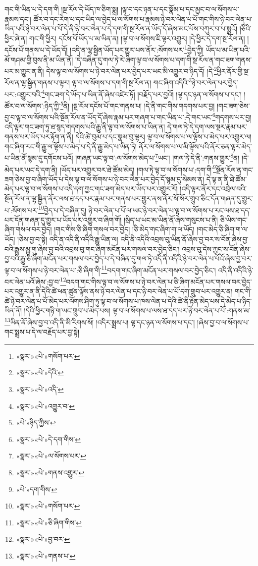 གང་གི་ཡིན་པ་དེ་དག་གི །སྔ་རོལ་དེ་ཡོད་ཁ་ཅིག་སྨྲ། །ལྟ་བ་དང་ཉན་པ་དང་སྣོམ་པ་དང་མྱང་བ་ལ་སོགས་པ་རྣམས་དང་། ཚོར་བ་དང་རེག་པ་དང་ཡིད་ལ་བྱེད་པ་ལ་སོགས་པ་རྣམས་ཉེ་བར་ལེན་པ་པོ་གང་གིས་ཉེ་བར་ལེན་པ་ཡིན་པའི་ཉེ་བར་ལེན་པ་པོ་དེ་ནི་ཉེ་བར་ལེན་པ་དེ་དག་གི་སྔ་རོལ་ན་ཡོད་དོ་ཞེས་མང་པོས་བཀུར་བ་པ་སྨྲའོ། །ཅིའི་ཕྱིར་ཞེ་ན། གང་གི་ཕྱིར། དངོས་པོ་ཡོད་པ་མ་ཡིན་ན། །ལྟ་བ་ལ་སོགས་ཇི་ལྟར་འགྱུར། །དེ་ཕྱིར་དེ་དག་སྔ་རོལ་ན། །དངོས་པོ་གནས་པ་དེ་ཡོད་དོ། །འདི་ན་ལྷ་སྦྱིན་ཡོད་པར་གྱུར་པས་ནོར་:སོགས་པར་\footnote{«སྣར་»«པེ་»གསོག་པར་}བྱེད་ཀྱི། ཡོད་པ་མ་ཡིན་པའི་མོ་གཤམ་གྱི་བུས་ནི་མ་ཡིན་ནོ། །དེ་བཞིན་དུ་གལ་ཏེ་རེ་ཞིག་ལྟ་བ་ལ་སོགས་པ་དག་གི་སྔ་རོལ་ན་གང་ཟག་གནས་པར་མ་གྱུར་ན་ནི། དེས་ལྟ་བ་ལ་སོགས་པ་ཉེ་བར་ལེན་པར་བྱེད་པར་ཡང་མི་འགྱུར་བ་ཉིད་དོ། །དེ་\footnote{«སྣར་»«པེ་»དེའི་}ཕྱིར་ནོར་གྱི་སྔ་རོལ་ན་ལྷ་སྦྱིན་གནས་པ་ལྟར། ལྟ་བ་ལ་སོགས་པ་དག་གི་སྔ་རོལ་ན། གང་ཞིག་འདིའི་\footnote{«སྣར་»«པེ་»འདི་}ཉེ་བར་ལེན་པར་བྱེད་པར་:འགྱུར་བའི་\footnote{«སྣར་»«པེ་»འགྱུར་བ་}གང་ཟག་དེ་ཡོད་པ་ཡིན་ནོ་ཞེས་འཛེར་ཏོ། །བརྗོད་པར་བྱའོ། །ལྟ་དང་ཉན་ལ་སོགས་པ་དང་། །ཚོར་བ་ལ་སོགས་:ཉིད་ཀྱི་\footnote{«པེ་»ཉིད་ཀྱིས་}ནི། །སྔ་རོལ་དངོས་པོ་གང་གནས་པ། །དེ་ནི་གང་གིས་གདགས་པར་བྱ། །གང་ཟག་ཅེས་བྱ་བ་ལྟ་བ་ལ་སོགས་པའི་སྔོན་རོལ་ན་ཡོད་དོ་ཞེས་རྣམ་པར་གཞག་པ་གང་ཡིན་པ་:དེ་གང་ཡང་\footnote{«སྣར་»«པེ་»དེ་དག་གིས་}གདགས་པར་བྱ། འདི་ལྟར་གང་ཟག་ཏུ་ཐ་སྙད་གདགས་པའི་རྒྱུ་ནི་ལྟ་བ་ལ་སོགས་པ་ཡིན་ན། དེ་གལ་ཏེ་དེ་དག་ལས་སྔར་རྣམ་པར་གནས་པར་ཡོད་པར་རྟོག་ན་ནི། དེའི་ཚེ་བུམ་པ་དང་སྣམ་བུ་ལྟར། ལྟ་བ་ལ་སོགས་པ་ལ་ལྟོས་པ་མེད་པར་འགྱུར་ལ། གང་ཞིག་རང་གི་རྒྱུ་ལ་ལྟོས་པ་མེད་པ་དེ་ནི་རྒྱུ་མེད་པ་ཡིན་ཏེ། ནོར་ལ་སོགས་པ་ལ་མི་ལྟོས་པའི་ནོར་ཅན་ལྟར་མེད་པ་ཡིན་ནོ་སྙམ་དུ་དགོངས་པའོ། །གཞན་ཡང་ལྟ་བ་:ལ་སོགས་མེད་པ་\footnote{«སྣར་»«པེ་»ལ་སོགས་པར་}ཡང་། །གལ་ཏེ་དེ་ནི་:གནས་གྱུར་\footnote{«སྣར་»«པེ་»གནས་འགྱུར་}ན། །དེ་མེད་པར་ཡང་དེ་དག་ནི། །ཡོད་པར་འགྱུར་བར་ཐེ་ཚོམ་མེད། །གལ་ཏེ་ལྟ་བ་ལ་སོགས་པ་:དག་གི་\footnote{«པེ་»དག་གིས་}སྔོན་རོལ་ན་གང་ཟག་ཅེས་བྱ་བ་ཞིག་ཡོད་པ་དེས་ལྟ་བ་ལ་སོགས་པ་ཉེ་བར་ལེན་པར་བྱེད་དོ་སྙམ་དུ་སེམས་ན། དེ་ལྟ་ན་ནི་ཐེ་ཚོམ་མེད་པར་ལྟ་བ་ལ་སོགས་པ་འདི་དག་ཀྱང་གང་ཟག་མེད་པར་ཡོད་པར་འགྱུར་རོ། །འདི་ལྟར་ནོར་དང་འབྲེལ་བའི་སྔོན་རོལ་ན་ལྷ་སྦྱིན་ནོར་ལས་ཐ་དད་པར་རྣམ་པར་གནས་པར་གྱུར་ནས་ནོར་སོ་སོར་གྲུབ་ཅིང་དོན་གཞན་དུ་གྱུར་པ་:སོགས་པར་\footnote{«སྣར་»«པེ་»གསོག་པར་}བྱེད་པ་དེ་བཞིན་དུ། ཉེ་བར་ལེན་པ་པོ་ལ་ཡང་ཉེ་བར་ལེན་པ་ལྟ་བ་ལ་སོགས་པ་རང་ལས་ཐ་དད་པར་དོན་གཞན་དུ་གྱུར་པ་ཡོད་པར་འགྱུར་བ་ཞིག་གོ། །སྲིད་པ་ཡང་མ་ཡིན་ནོ་ཞེས་གསུངས་པ་ནི། ཅི་ཡིས་གང་ཞིག་གསལ་བར་བྱེད། །གང་གིས་ཅི་ཞིག་གསལ་བར་བྱེད། །ཅི་མེད་གང་ཞིག་ག་ལ་ཡོད། །གང་མེད་ཅི་ཞིག་ག་ལ་ཡོད། །ཅེས་བྱ་བ་སྟེ། འདི་ན་འདི་ནི་འདིའི་རྒྱུ་ཡིན་ལ། འདི་ནི་འདིའི་འབྲས་བུ་ཡིན་ནོ་ཞེས་བྱ་བར་ས་བོན་ཞེས་བྱ་བའི་རྒྱུས་མྱུ་གུ་ཞེས་བྱ་བའི་འབྲས་བུ་གང་ཞིག་མངོན་པར་གསལ་བར་བྱེད་ཅིང་། འབྲས་བུ་དེས་ཀྱང་ས་བོན་ཞེས་བྱ་བའི་རྒྱུ་ཅི་ཞིག་མངོན་པར་གསལ་བར་བྱེད་པ་དེ་བཞིན་དུ་གལ་ཏེ་འདི་ནི་འདིའི་ཉེ་བར་ལེན་པ་པོའོ་ཞེས་བྱ་བར་ལྟ་བ་ལ་སོགས་པ་ཉེ་བར་ལེན་པ་:ཅི་ཞིག་གི་\footnote{«སྣར་»«པེ་»ཅི་ཞིག་གིས་}བདག་གང་ཞིག་མངོན་པར་གསལ་བར་བྱེད་ཅིང་། འདི་ནི་འདིའི་ཉེ་བར་ལེན་པའོ་ཞེས་:བྱ་བ་\footnote{«སྣར་»«པེ་»བྱ་བར་}བདག་གང་གིས་ལྟ་བ་ལ་སོགས་པ་ཉེ་བར་ལེན་པ་ཅི་ཞིག་མངོན་པར་གསལ་བར་བྱེད་པར་འགྱུར་ན་ནི་དེའི་ཚེ་ཕན་ཚུན་ལྟོས་ནས་ཉེ་བར་ལེན་པ་དང་ཉེ་བར་ལེན་པ་པོ་དག་གྲུབ་པར་འགྱུར་ན། གང་གི་ཚེ་ཉེ་བར་ལེན་པ་པོ་མེད་པར་ལོགས་ཤིག་ཏུ་ལྟ་བ་ལ་སོགས་པ་ཁས་ལེན་པ་དེའི་ཚེ་ནི་རྟེན་མེད་པས་དེ་མེད་པ་ཉིད་ཡིན་ནོ། །དེའི་ཕྱིར་གཉི་ག་ཡང་གྲུབ་པ་མེད་པས། ལྟ་བ་ལ་སོགས་པ་ལས་ཐ་དད་པར་ཉེ་བར་ལེན་པ་པོ་:གནས་མ་\footnote{«སྣར་»«པེ་»གནས་པ་}ཡིན་ནོ་ཞེས་བྱ་བ་འདི་ནི་མི་རིགས་སོ། །འདིར་སྨྲས་པ། ལྟ་དང་ཉན་ལ་སོགས་པ་དང་། །ཞེས་བྱ་བ་ལ་སོགས་པ་གང་སྨྲས་པ་དེ་ལ་བརྗོད་པར་བྱ་སྟེ། 